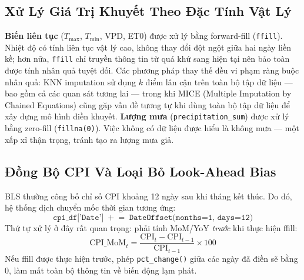 \documentclass[conference]{IEEEtran}
\begin{document}
\subsection{Xử Lý Giá Trị Khuyết Theo Đặc Tính Vật Lý}
\textbf{Biến liên tục} ($T_{\max}$, $T_{\min}$, VPD, ET0) được xử lý bằng
forward-fill (\texttt{ffill}). Nhiệt độ có tính liên tục vật lý cao, không
thay đổi đột ngột giữa hai ngày liền kề; hơn nữa, \texttt{ffill} chỉ truyền
thông tin từ quá khứ sang hiện tại nên bảo toàn được tính nhân quả tuyệt đối.
Các phương pháp thay thế đều vi phạm ràng buộc nhân quả: KNN imputation sử
dụng $k$ điểm lân cận trên toàn bộ tập dữ liệu --- bao gồm cả các quan sát
tương lai --- trong khi MICE (Multiple Imputation by Chained Equations) cũng
gặp vấn đề tương tự khi dùng toàn bộ tập dữ liệu để xây dựng mô hình điền
khuyết.
\textbf{Lượng mưa} (\texttt{precipitation\_sum}) được xử lý bằng zero-fill
(\texttt{fillna(0)}). Việc không có dữ liệu được hiểu là không mưa --- một
xấp xỉ thận trọng, tránh tạo ra lượng mưa giả.
\subsection{Đồng Bộ CPI Và Loại Bỏ Look-Ahead Bias}
BLS thường công bố chỉ số CPI khoảng 12 ngày sau khi tháng kết thúc. Do đó,
hệ thống dịch chuyển mốc thời gian tương ứng:
\begin{equation}
\texttt{cpi\_df['Date']} \;\mathrel{+}=\;
\texttt{DateOffset(months=1, days=12)}
\label{eq:cpi_shift}
\end{equation}
Thứ tự xử lý ở đây rất quan trọng: phải tính MoM/YoY \emph{trước} khi thực
hiện ffill:
\begin{equation}
\text{CPI\_MoM}_t = \frac{\text{CPI}_t - \text{CPI}_{t-1}}{\text{CPI}_{t-1}}
\times 100
\label{eq:cpi_mom}
\end{equation}
Nếu ffill được thực hiện trước, phép \texttt{pct\_change()} giữa các ngày đã
điền sẽ bằng 0, làm mất toàn bộ thông tin về biến động lạm phát.
\end{document}
